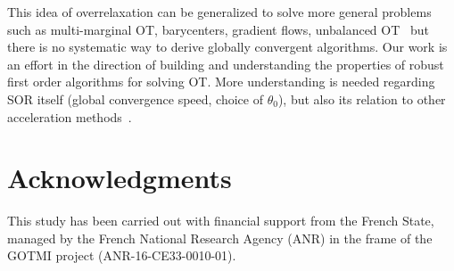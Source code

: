 \documentclass{article} %
\theoremstyle{plain}
\theoremstyle{definition}
\theoremstyle{remark}
\begin{document}
This idea of overrelaxation can be generalized to solve more general problems such as multi-marginal OT, barycenters, gradient flows, unbalanced OT~\cite[chap. 4]{chizat2017these} but there is no systematic way to derive globally convergent algorithms.
Our work is an effort in the direction of building and understanding the properties of robust first order algorithms for solving OT. More understanding is needed regarding SOR itself (global convergence speed, choice of $\theta_0$), but also its relation to other acceleration methods~\cite{2016arXiv160604133S,2017arXiv170509634A}.






\section*{Acknowledgments}
This study has been carried out with financial support from the French State, managed by the French National Research Agency (ANR) in the frame of the  GOTMI project (ANR-16-CE33-0010-01).




\end{document}

